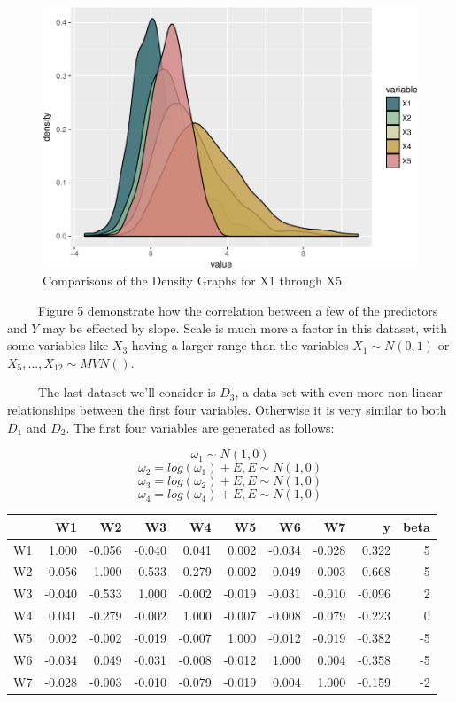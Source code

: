 \documentclass[12pt,twoside]{reedthesis}
\begin{document}
  \begin{figure}[htbp]
  \centering
  \includegraphics{Thesis_files/figure-latex/densityD2-1.pdf}
  \caption{\label{fig:densityD2}Comparisons of the Density Graphs for X1
  through X5}
  \end{figure}
  
  ~~~~~Figure 5 demonstrate how the correlation between a few of the
  predictors and \(Y\) may be effected by slope. Scale is much more a
  factor in this dataset, with some variables like \(X_3\) having a larger
  range than the variables \(X_1 \sim N(0,1)\) or
  \(X_5,...,X_{12} \sim MVN()\).
  
  ~~~~~The last dataset we'll consider is \(D_3\), a data set with even
  more non-linear relationships between the first four variables.
  Otherwise it is very similar to both \(D_1\) and \(D_2\). The first four
  variables are generated as follows:
  
  \[\omega_1 \sim N(1,0)\] \[\omega_2 = log(\omega_1) + E, E \sim N(1,0)\]
  \[\omega_3 = log(\omega_2) + E, E \sim N(1,0)\]
  \[\omega_4 = log(\omega_4) + E, E \sim N(1,0)\]
  
  \begin{tabular}{l|r|r|r|r|r|r|r|r|r}
  \hline
    & W1 & W2 & W3 & W4 & W5 & W6 & W7 & y & beta\\
  \hline
  W1 & 1.000 & -0.056 & -0.040 & 0.041 & 0.002 & -0.034 & -0.028 & 0.322 & 5\\
  \hline
  W2 & -0.056 & 1.000 & -0.533 & -0.279 & -0.002 & 0.049 & -0.003 & 0.668 & 5\\
  \hline
  W3 & -0.040 & -0.533 & 1.000 & -0.002 & -0.019 & -0.031 & -0.010 & -0.096 & 2\\
  \hline
  W4 & 0.041 & -0.279 & -0.002 & 1.000 & -0.007 & -0.008 & -0.079 & -0.223 & 0\\
  \hline
  W5 & 0.002 & -0.002 & -0.019 & -0.007 & 1.000 & -0.012 & -0.019 & -0.382 & -5\\
  \hline
  W6 & -0.034 & 0.049 & -0.031 & -0.008 & -0.012 & 1.000 & 0.004 & -0.358 & -5\\
  \hline
  W7 & -0.028 & -0.003 & -0.010 & -0.079 & -0.019 & 0.004 & 1.000 & -0.159 & -2\\
  \hline
  \end{tabular}
  
\end{document}
